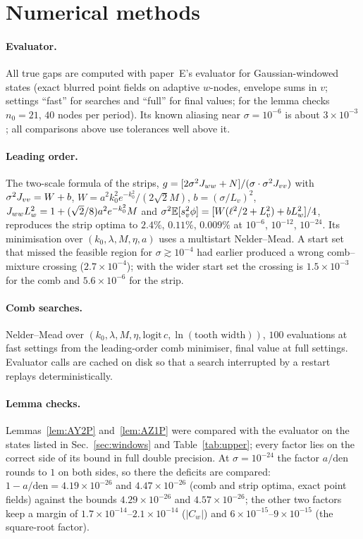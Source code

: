\section{Numerical methods}
\label{app:numerics}

\paragraph*{Evaluator.}
All true gaps are computed with paper~E's evaluator for Gaussian-windowed states (exact blurred point fields on adaptive $w$-nodes, envelope
sums in $v$; settings ``fast'' for searches and ``full'' for final values; for the lemma checks $n_0=21$, $40$ nodes per period). Its known
aliasing near $\sigma=10^{-6}$ is about $3\times10^{-3}$; all comparisons above use tolerances well above it.

\paragraph*{Leading order.}
The two-scale formula of the strips, $g=[2\sigma^2J_{ww}+N]/(\sigma\cdot\sigma^2J_{vv})$ with $\sigma^2J_{vv}=W+b$, $W=a^2k_0^2e^{-k_0^2}/(2\sqrt2M)$,
$b=(\sigma/L_v)^2$, $J_{ww} L_w^2=1+(\sqrt2/8)a^2e^{-k_0^2}M$ and $\sigma^2\mathbb{E}[s_v^2\phi]=[W(\ell^2/2+L_v^2)+bL_w^2]/4$, reproduces the strip optima to
$2.4\%$, $0.11\%$, $0.009\%$ at $10^{-6}$, $10^{-12}$, $10^{-24}$. Its minimisation over $(k_0,\lambda,M,\eta,a)$ uses a multistart Nelder--Mead.
A start set that missed the feasible region for $\sigma\gtrsim10^{-4}$ had earlier produced a wrong comb--mixture crossing ($2.7\times10^{-4}$);
with the wider start set the crossing is $1.5\times10^{-3}$ for the comb and $5.6\times10^{-6}$ for the strip.

\paragraph*{Comb searches.}
Nelder--Mead over $(k_0,\lambda,M,\eta,\mathrm{logit}\,c,\ln(\text{tooth width}))$, $100$ evaluations at fast settings from the leading-order
comb minimiser, final value at full settings. Evaluator calls are cached on disk so that a search interrupted by a restart replays
deterministically.

\paragraph*{Lemma checks.}
Lemmas~\ref{lem:AY2P} and~\ref{lem:AZ1P} were compared with the evaluator on the states listed in Sec.~\ref{sec:windows} and
Table~\ref{tab:upper}; every factor lies on the correct side of its bound in full double precision. At $\sigma=10^{-24}$ the factor
$a/\mathrm{den}$ rounds to $1$ on both sides, so there the deficits are compared: $1-a/\mathrm{den}=4.19\times10^{-26}$ and $4.47\times10^{-26}$
(comb and strip optima, exact point fields) against the bounds $4.29\times10^{-26}$ and $4.57\times10^{-26}$; the other two factors keep a
margin of $1.7\times10^{-14}$--$2.1\times10^{-14}$ ($|C_w|$) and $6\times10^{-15}$--$9\times10^{-15}$ (the square-root factor).
